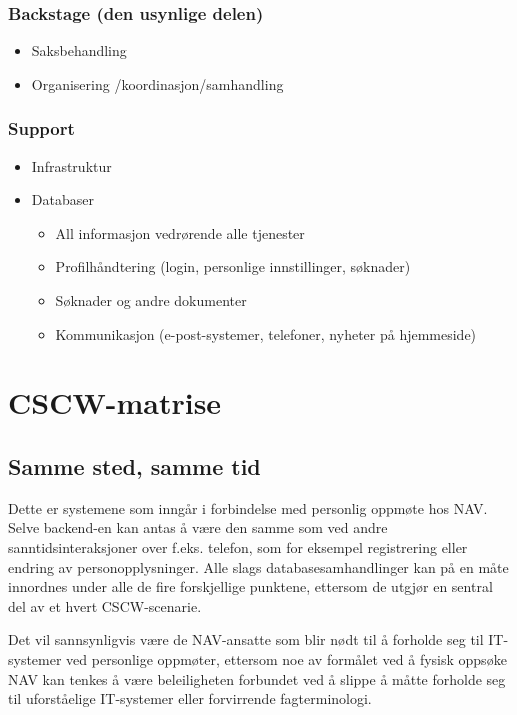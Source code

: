 \documentclass[informationsecurity]{gucmasterproject}
\begin{document}
\subsubsection{Backstage (den usynlige delen)}
\begin{itemize}
\item Saksbehandling
\item Organisering /koordinasjon/samhandling
\end{itemize}

\subsubsection{Support}
\begin{itemize}
\item Infrastruktur
\item Databaser
	\begin{itemize}
	\item All informasjon vedrørende alle tjenester
	\item Profilhåndtering (login, personlige innstillinger, søknader)
	\item Søknader og andre dokumenter
	\item Kommunikasjon (e-post-systemer, telefoner, nyheter på hjemmeside)
	\end{itemize}
\end{itemize}


\section{CSCW-matrise}
\subsection{Samme sted, samme tid}
Dette er systemene som inngår i forbindelse med personlig oppmøte hos NAV. Selve backend-en kan antas å være den samme som ved andre sanntidsinteraksjoner over f.eks. telefon, som for eksempel registrering eller endring av personopplysninger. Alle slags databasesamhandlinger kan på en måte innordnes under alle de fire forskjellige punktene, ettersom de utgjør en sentral del av et hvert CSCW-scenarie.

Det vil sannsynligvis være de NAV-ansatte som blir nødt til å forholde seg til IT-systemer ved personlige oppmøter, ettersom noe av formålet ved å fysisk oppsøke NAV kan tenkes å være beleiligheten forbundet ved å slippe å måtte forholde seg til uforståelige IT-systemer eller forvirrende fagterminologi.
\end{document}
